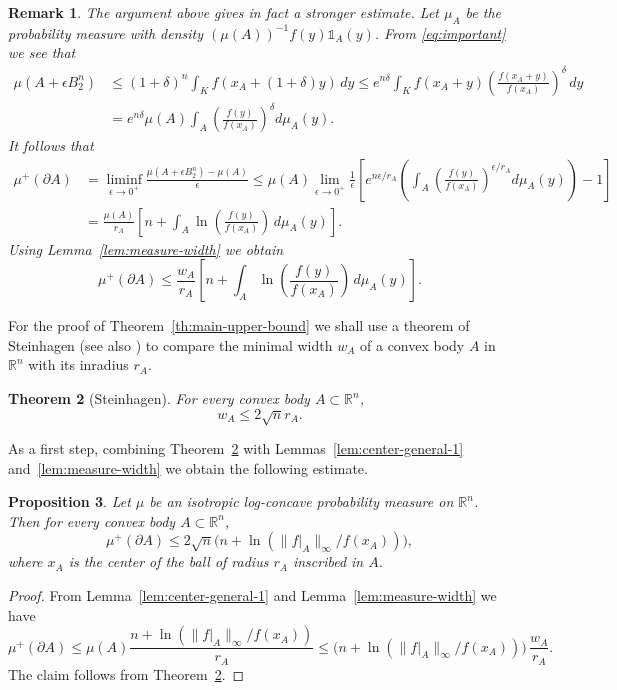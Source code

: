 \documentclass[11pt,leqno]{article}
\newtheorem{theorem}{Theorem}[section]
\newtheorem{proposition}[theorem]{Proposition}
\newtheorem{remark}[theorem]{Remark}
\theoremstyle{remark}
\numberwithin{equation}{section}
\newcommand{\ls}{\leqslant}
\begin{document}
\begin{remark}\rm The argument above gives in fact a stronger estimate. Let $\mu_A$ be the probability measure with density $(\mu(A))^{-1}f(y)\mathds{1}_A(y)$. 
From \eqref{eq:important} we see that
\begin{align*}
\mu(A+\epsilon B_2^n) &\ls (1+\delta)^n\int_Kf(x_A+(1+\delta)y)\,dy
\ls e^{n\delta}\int_Kf(x_A+y)\left(\frac{f(x_A+y)}{f(x_A)}\right)^{\delta}\,dy\\
&=e^{n\delta}\mu(A)\int_A\left(\frac{f(y)}{f(x_A)}\right)^{\delta}d\mu_A(y).
\end{align*}
It follows that
\begin{align*}\mu^+(\partial A) &=\liminf_{\epsilon\to 0^+}\frac{\mu(A+\epsilon B_2^n)-\mu(A)}{\epsilon }\ls \mu(A)\lim_{\epsilon\to 0^+}
\frac{1}{\epsilon }\left[e^{n\epsilon /r_A}\left(\int_A\left(\frac{f(y)}{f(x_A)}\right)^{\epsilon/r_A}d\mu_A(y)\right)-1\right]\\
&=\frac{\mu(A)}{r_A}\left[n+\int_A\ln \left(\frac{f(y)}{f(x_A)}\right)\,d\mu_A(y)\right]. 
\end{align*}
Using Lemma~\ref{lem:measure-width} we obtain
$$\mu^+(\partial A)\ls \frac{w_A}{r_A}\left[n+\int_A\ln \left(\frac{f(y)}{f(x_A)}\right)\,d\mu_A(y)\right].$$
\end{remark}

For the proof of Theorem~\ref{th:main-upper-bound} we shall use a theorem of Steinhagen \cite{Steinhagen-1922} (see also \cite[Theorem~1.5.2]{Toth-book}) 
to compare the minimal width $w_A$ of a convex body $A$ in $\mathbb{R}^n$ with its inradius $r_A$.

\begin{theorem}[Steinhagen]\label{th:steinhagen}For every convex body $A\subset\mathbb{R}^n$,
$$w_A\ls 2\sqrt{n}r_A.$$
\end{theorem}

As a first step, combining Theorem~\ref{th:steinhagen} with Lemmas~\ref{lem:center-general-1} and~\ref{lem:measure-width} we obtain the following estimate.

\begin{proposition}\label{prop:perimeter-general-1}Let $\mu$ be an isotropic log-concave probability measure on $\mathbb{R}^n$. Then for every  
convex body $A\subset\mathbb{R}^n$, 
$$\mu^+(\partial A)\ls 2\sqrt{n}\big(n+\ln(\|f\big|_A\|_{\infty}/f(x_A))\big),$$
where $x_A$ is the center of the ball of radius $r_A$ inscribed in $A$.
\end{proposition}

\begin{proof}From Lemma~\ref{lem:center-general-1} and Lemma~\ref{lem:measure-width} we have
$$\mu^+(\partial A)\ls \mu(A)\frac{n+\ln(\|f\big|_A\|_{\infty}/f(x_A))}{r_A}\ls \big(n+\ln(\|f\big|_A\|_{\infty}/f(x_A))\big)\,\frac{w_A}{r_A}.$$
The claim follows from Theorem~\ref{th:steinhagen}.
\end{proof}
\end{document}
